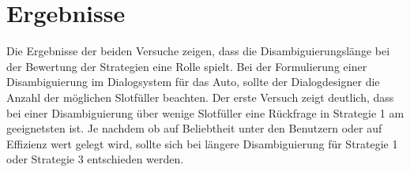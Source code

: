 \documentclass[12pt,a4paper]{scrartcl}
\begin{document}
\section{Ergebnisse}
\label{Ergebnisse}

Die Ergebnisse der beiden Versuche zeigen, dass die Disambiguierungslänge bei der Bewertung der Strategien eine Rolle spielt. Bei der Formulierung einer Disambiguierung im Dialogsystem für das Auto, sollte der Dialogdesigner die Anzahl der möglichen Slotfüller beachten. Der erste Versuch zeigt deutlich, dass bei einer Disambiguierung über wenige Slotfüller eine Rückfrage in Strategie 1 am geeignetsten ist. Je nachdem ob auf Beliebtheit unter den Benutzern oder auf Effizienz  wert gelegt wird, sollte sich bei längere Disambiguierung für Strategie 1 oder Strategie 3 entschieden werden. 
\end{document}
